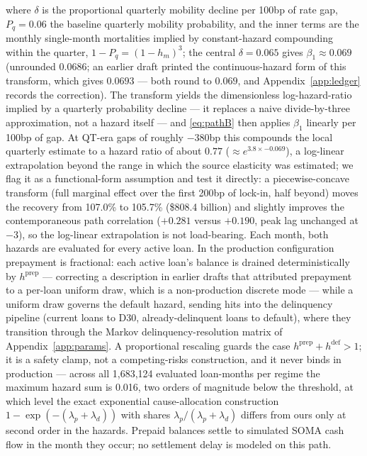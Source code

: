 \documentclass[12pt]{article}
\begin{document}
where $\delta$ is the proportional quarterly mobility decline per 100bp of rate gap, $P_q = 0.06$ the baseline quarterly mobility probability, and the inner terms are the monthly single-month mortalities implied by constant-hazard compounding within the quarter, $1 - P_q = (1 - h_m)^3$; the central $\delta = 0.065$ gives $\beta_1 \approx 0.069$ (unrounded $0.0686$; an earlier draft printed the continuous-hazard form of this transform, which gives $0.0693$ --- both round to $0.069$, and Appendix~\ref{app:ledger} records the correction). The transform yields the dimensionless log-hazard-ratio implied by a quarterly probability decline --- it replaces a naive divide-by-three approximation, not a hazard itself --- and \eqref{eq:pathB} then applies $\beta_1$ linearly per 100bp of gap. At QT-era gaps of roughly $-380$bp this compounds the local quarterly estimate to a hazard ratio of about $0.77$ ($\approx e^{3.8 \times -0.069}$), a log-linear extrapolation beyond the range in which the source elasticity was estimated; we flag it as a functional-form assumption and test it directly: a piecewise-concave transform (full marginal effect over the first 200bp of lock-in, half beyond) moves the recovery from 107.0\% to 105.7\% (\$808.4 billion) and slightly improves the contemporaneous path correlation ($+0.281$ versus $+0.190$, peak lag unchanged at $-3$), so the log-linear extrapolation is not load-bearing. Each month, both hazards are evaluated for every active loan. In the production configuration prepayment is fractional: each active loan's balance is drained deterministically by $h^{\mathrm{prep}}$ --- correcting a description in earlier drafts that attributed prepayment to a per-loan uniform draw, which is a non-production discrete mode --- while a uniform draw governs the default hazard, sending hits into the delinquency pipeline (current loans to D30, already-delinquent loans to default), where they transition through the Markov delinquency-resolution matrix of Appendix~\ref{app:params}. A proportional rescaling guards the case $h^{\mathrm{prep}} + h^{\mathrm{def}} > 1$; it is a safety clamp, not a competing-risks construction, and it never binds in production --- across all 1,683,124 evaluated loan-months per regime the maximum hazard sum is 0.016, two orders of magnitude below the threshold, at which level the exact exponential cause-allocation construction $1-\exp(-(\lambda_p+\lambda_d))$ with shares $\lambda_p/(\lambda_p+\lambda_d)$ differs from ours only at second order in the hazards. Prepaid balances settle to simulated SOMA cash flow in the month they occur; no settlement delay is modeled on this path.
\end{document}
